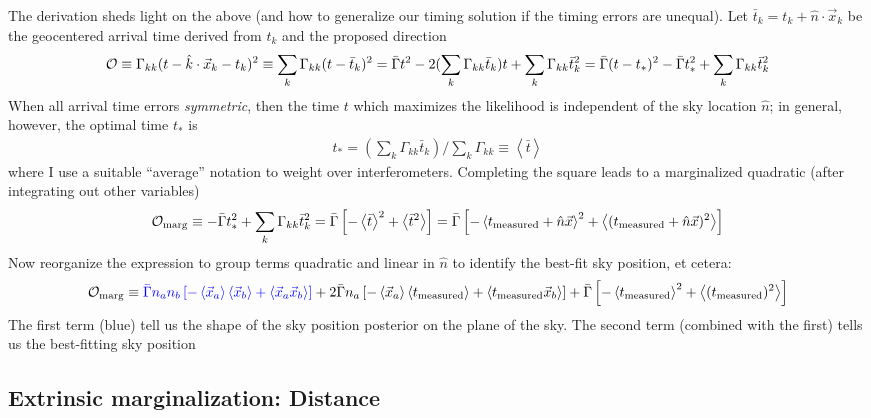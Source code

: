 \documentclass[twocolumn,prd,nofootinbib]{revtex4}
\begin{document}
\begin{widetext}
{\begin{shaded}
The derivation sheds light on the above (and how to generalize our timing solution if the timing errors are unequal).
Let $\bar{t}_k = t_k+\hat{n}\cdot \vec{x}_k$ be the geocentered arrival time derived from $t_k$ and the proposed direction
\begin{eqnarray}
{\cal O}\equiv \Gamma_{kk}(t-\hat{k}\cdot \vec{x}_k -t_k)^2 \equiv \sum_k\Gamma_{kk}(t-\bar{t}_k)^2 
= \bar{\Gamma} t^2 - 2 (\sum_k \Gamma_{kk} \bar{t}_k)t + \sum_k \Gamma_{kk}\bar{t}_k^2 
= \bar{\Gamma}(t-t_*)^2 - \bar{\Gamma} t_*^2  + \sum_k \Gamma_{kk}\bar{t}_k^2 
\end{eqnarray}
When all arrival time errors  \emph{symmetric}, then the time $t$ which maximizes the likelihood is  independent of the
sky location $\hat{n}$; in general, however, the optimal time $t_*$ is
\begin{eqnarray}
t_*  = (\sum_k \Gamma_{kk} \bar{t}_k)/\sum_k \Gamma_{kk} \equiv \left<\bar{t}\right>
\end{eqnarray}
where I use a suitable ``average'' notation to weight over interferometers. 
Completing the square leads to a marginalized quadratic (after integrating out other variables)
\begin{eqnarray}
{\cal O}_{\rm marg}\equiv - \bar{\Gamma} t_*^2  + \sum_k \Gamma_{kk}\bar{t}_k^2  
 = \bar{\Gamma}\left[ -\left<\bar{t}\right>^2 + \left<\bar{t}^2 \right> \right]
 = \bar{\Gamma}\left[ -\left<t_{\rm measured}+\hat{n}\vec{x}\right>^2 + \left<(t_{\rm measured}+\hat{n}\vec{x})^2
  \right>
 \right]
\end{eqnarray}
Now reorganize the expression to group terms quadratic and linear in $\hat{n}$ to identify the best-fit sky position, et
cetera:
\begin{eqnarray}
{\cal O}_{\rm marg} \equiv 
{\color{blue}\bar{\Gamma}n_a n_b \left[
   -\left<\vec{x}_a\right>\left<\vec{x}_b\right> + \left<\vec{x}_a \vec{x}_b\right>
 \right]
}
+{ 2 \bar{\Gamma}n_a  \left[
   -\left<\vec{x}_a \right>\left<t_{\rm measured}\right> + \left< t_{\rm measured} \vec{x}_b\right>
 \right]
}
+  \bar{\Gamma}  \left[
 -\left<t_{\rm measured}\right>^2 + \left<(t_{\rm measured})^2 \right>
 \right]
\end{eqnarray}
The first  term (blue) tell us the shape of the sky position posterior on the plane of the sky.  The second term
(combined with the first) tells us the best-fitting sky position
\end{shaded}
} %


\subsection{Extrinsic marginalization: Distance }


\end{widetext}
\end{document}
